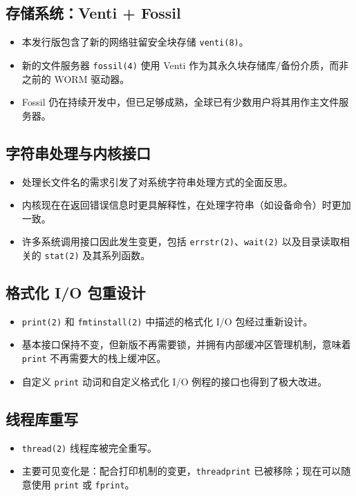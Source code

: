 \documentclass[12pt,UTF8]{ctexbook}
\begin{document}
\subsection{存储系统：Venti + Fossil}

\begin{itemize}
\item 本发行版包含了新的网络驻留安全块存储 \texttt{venti(8)}。
\item 新的文件服务器 \texttt{fossil(4)} 使用 Venti 作为其永久块存储库/备份介质，而非之前的 WORM 驱动器。
\item Fossil 仍在持续开发中，但已足够成熟，全球已有少数用户将其用作主文件服务器。
\end{itemize}

\subsection{字符串处理与内核接口}

\begin{itemize}
\item 处理长文件名的需求引发了对系统字符串处理方式的全面反思。
\item 内核现在在返回错误信息时更具解释性，在处理字符串（如设备命令）时更加一致。
\item 许多系统调用接口因此发生变更，包括 \texttt{errstr(2)}、\texttt{wait(2)} 以及目录读取相关的 \texttt{stat(2)} 及其系列函数。
\end{itemize}

\subsection{格式化 I/O 包重设计}

\begin{itemize}
\item \texttt{print(2)} 和 \texttt{fmtinstall(2)} 中描述的格式化 I/O 包经过重新设计。
\item 基本接口保持不变，但新版不再需要锁，并拥有内部缓冲区管理机制，意味着 \texttt{print} 不再需要大的栈上缓冲区。
\item 自定义 \texttt{print} 动词和自定义格式化 I/O 例程的接口也得到了极大改进。
\end{itemize}

\subsection{线程库重写}

\begin{itemize}
\item \texttt{thread(2)} 线程库被完全重写。
\item 主要可见变化是：配合打印机制的变更，\texttt{threadprint} 已被移除；现在可以随意使用 \texttt{print} 或 \texttt{fprint}。
\end{itemize}
\end{document}
